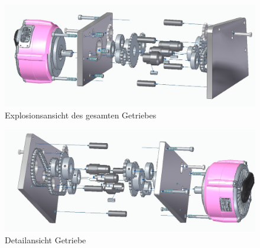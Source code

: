 \begin{figure} [H]
	\begin{center}
		\includegraphics[scale=0.4]{figures/mechanik/Getriebe_Explosion_4.jpg}
			\caption{Explosionsansicht des gesamten Getriebes}
			\label{fig:Explosionsansicht des gesamten Getriebes}
	\end{center}
\end{figure}


\begin{figure} [H]
	\begin{center}
		\includegraphics[scale=0.4]{figures/mechanik/Getriebe_Explosion_5.jpg}
			\caption{Detailansicht Getriebe}
			\label{fig:Detailansicht Getriebe}
	\end{center}
\end{figure}



 
%
%
%
